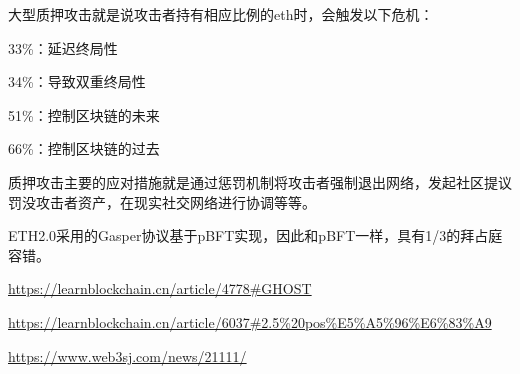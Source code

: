 \documentclass[a4paper,twoside]{scrbook}
\begin{document}
\begin{CJK}{UTF8}{gbsn}
大型质押攻击就是说攻击者持有相应比例的eth时，会触发以下危机：

33\%：延迟终局性

34\%：导致双重终局性

51\%：控制区块链的未来

66\%：控制区块链的过去

质押攻击主要的应对措施就是通过惩罚机制将攻击者强制退出网络，发起社区提议罚没攻击者资产，在现实社交网络进行协调等等。

ETH2.0采用的Gasper协议基于pBFT实现，因此和pBFT一样，具有1/3的拜占庭容错。

\url{https://learnblockchain.cn/article/4778#GHOST}

\url{https://learnblockchain.cn/article/6037#2.5%20pos%E5%A5%96%E6%83%A9}

\url{https://www.web3sj.com/news/21111/}

\printbibliography
\end{CJK}
\end{document}
